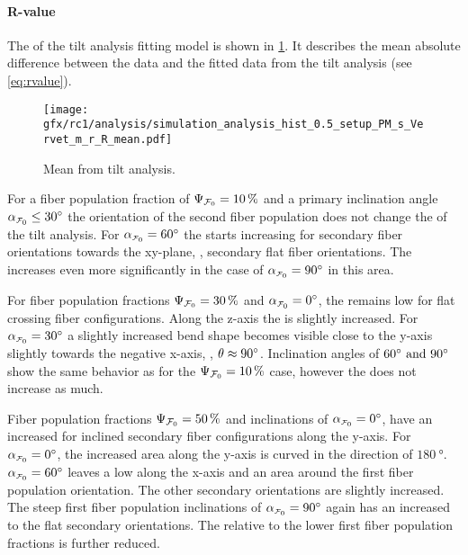 \paragraph{R-value}
%
The \rvalue{} of the tilt analysis fitting model is shown in \cref{fig:sim_ana_rvalue}.
It describes the mean absolute difference between the data and the fitted data from the tilt analysis (see \cref{eq:rvalue}).
\par
%
\begin{figure}[!p]
\centering
\texttt{[image: gfx/rc1/analysis/simulation\_analysis\_hist\_0.5\_setup\_PM\_s\_Vervet\_m\_r\_R\_mean.pdf]}
\caption[]{Mean \rvalue{} from tilt analysis.}
\label{fig:sim_ana_rvalue}
\end{figure}
%
For a fiber population fraction of $\textnormal{$\Psi_{\textnormal{$\mathcal{F}_0$}}$}=\SI{10}{\percent}$ and a primary inclination angle $\modelInc\leq\SI{30}{\degree}$ the orientation of the second fiber population does not change the \rvalue{} of the tilt analysis.
For $\modelInc=\SI{60}{\degree}$ the \rvalue{} starts increasing for secondary fiber orientations towards the xy-plane, \ie{}, secondary flat fiber orientations.
The \rvalue{} increases even more significantly in the case of $\modelInc=\SI{90}{\degree}$ in this area.
\par
%
For fiber population fractions $\textnormal{$\Psi_{\textnormal{$\mathcal{F}_0$}}$}=\SI{30}{\percent}$ and $\modelInc=\SI{0}{\degree}$, the \rvalue{} remains low for flat crossing fiber configurations.
Along the z-axis the \rvalue{} is slightly increased.
For $\modelInc=\SI{30}{\degree}$ a slightly increased bend shape becomes visible close to the y-axis slightly towards the negative x-axis, \ie{}, $\textnormal{$\theta$} \approx \SI{90}{\degree}$.
Inclination angles of $\SIlist{60;90}{\degree}$ show the same behavior as for the $\textnormal{$\Psi_{\textnormal{$\mathcal{F}_0$}}$}=\SI{10}{\percent}$ case, however the \rvalue{} does not increase as much.
\par
%
Fiber population fractions $\textnormal{$\Psi_{\textnormal{$\mathcal{F}_0$}}$}=\SI{50}{\percent}$ and inclinations of $\modelInc=\SI{0}{\degree}$, have an increased \rvalue{} for inclined secondary fiber configurations along the y-axis.
For $\modelInc=\SI{0}{\degree}$, the increased area along the y-axis is curved in the direction of $\SI{180}{\degree}$.
$\modelInc=\SI{60}{\degree}$ leaves a low \rvalue{} along the x-axis and an area around the first fiber population orientation.
The other secondary orientations are slightly increased.
The steep first fiber population inclinations of $\modelInc=\SI{90}{\degree}$ again has an increased \rvalue{} to the flat secondary orientations.
The \rvalue{} relative to the lower first fiber population fractions is further reduced.
